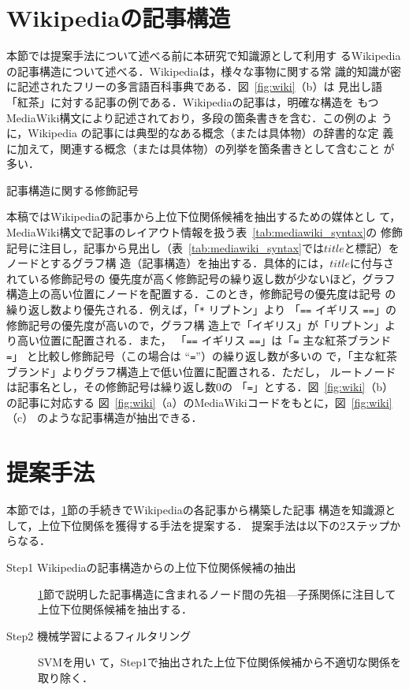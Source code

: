 \documentclass[japanese]{jnlp_1.4}
\begin{document}
\section{Wikipediaの記事構造}\label{sec:wikipedia}

本節では提案手法について述べる前に本研究で知識源として利用す
るWikipediaの記事構造について述べる．Wikipediaは，様々な事物に関する常
識的知識が密に記述されたフリーの多言語百科事典である．図~\ref{fig:wiki}（b）は
見出し語「紅茶」に対する記事の例である．Wikipediaの記事は，明確な構造を
もつMediaWiki構文により記述されており，多段の箇条書きを含む．この例のよ
うに，Wikipedia の記事には典型的なある概念（または具体物）の辞書的な定
義に加えて，関連する概念（または具体物）の列挙を箇条書きとして含むこと
が多い．

\begin{table}[b]
\vspace{-1\baselineskip}
\caption{記事構造に関する修飾記号}
\label{tab:mediawiki_syntax}

\end{table}

本稿ではWikipediaの記事から上位下位関係候補を抽出するための媒体とし
て，MediaWiki構文で記事のレイアウト情報を扱う表~\ref{tab:mediawiki_syntax}の
修飾記号に注目し，記事から見出し（表~\ref{tab:mediawiki_syntax}では$title$と標記）をノードとするグラフ構
造（記事構造）を抽出する．具体的には，$title$に付与されている修飾記号の
優先度が高く修飾記号の{繰り返し数}が{少ない}ほど，グラフ
構造上の高い位置にノードを配置する．このとき，修飾記号の優先度は記号
の{繰り返し数}より優先される．例えば，「\verb!*! リプトン」より
「\verb!==! イギリス \verb!==!」の修飾記号の優先度が高いので，グラフ構
造上で「イギリス」が「リプトン」より高い位置に配置される．また，
「\verb!==! イギリス \verb!==!」は「\verb!=! 主な紅茶ブランド \verb!=!」
と比較し修飾記号{（この場合は ``\verb!=!''）の繰り返し数}が{多い}の
で，「主な紅茶ブランド」よりグラフ構造上で低い位置に配置される．ただし，
ルートノードは記事名とし，その修飾記号は{繰り返し数}0の
「\verb!=!」とする．図~\ref{fig:wiki}（b）の記事に対応する
図~\ref{fig:wiki}（a）のMediaWikiコードをもとに，図~\ref{fig:wiki}（c）
のような記事構造が抽出できる．



\section{提案手法}\label{sec:method}

本節では，\ref{sec:wikipedia}節の手続きでWikipediaの各記事から構築した記事
構造を知識源として，上位下位関係を獲得する手法を提案する．
提案手法は以下の2ステップからなる．
\begin{description}
      \item[Step1 Wikipediaの記事構造からの上位下位関係候補の抽出] 
    \ref{sec:wikipedia}節で説明した記事構造に含まれるノード間の先祖—子孫関係に注目して上位下位関係候補を抽出する．
      \item[Step2 機械学習によるフィルタリング] SVM\cite{Vapnik}を用い
    て，Step1で抽出された上位下位関係候補から不適切な関係を取り除く．
\end{description}
\end{document}

